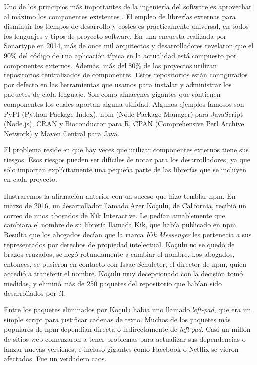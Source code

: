 

Uno de los principios más importantes de la ingeniería del software es aprovechar al máximo los componentes existentes \cite{sametinger1997software}.
El empleo de librerías externas para disminuir los tiempos de desarrollo y costes es prácticamente universal,
en todos los lenguajes y tipos de proyecto software. En una encuesta realizada por Sonartype en 2014, más de once mil arquitectos y
desarrolladores revelaron que el 90\% del código de una aplicación típica en la actualidad está compuesto por componentes externos.
Además, más del 80\% de los proyectos utilizan repositorios centralizados de componentes.
Estos repositorios están configurados por defecto en las herramientas que usamos para instalar y administrar los paquetes de cada lenguaje.
Son como almacenes gigantes que contienen componentes los cuales aportan alguna utilidad.
Algunos ejemplos famosos son PyPI (Python Package Index), npm (Node Package Manager) para JavaScript (Node.js),
CRAN y Bioconductor para R, CPAN (Comprehensive Perl Archive Network) y Maven Central para Java.


El problema reside en que hay veces que utilizar componentes externos tiene sus riesgos. Esos riesgos pueden ser difíciles de 
notar para los desarrolladores, ya que sólo importan explícitamente una pequeña parte de las librerías que se incluyen en cada proyecto.


Ilustraremos la afirmación anterior con un suceso que hizo temblar npm.
En marzo de 2016, un desarrollador llamado Azer Koçulu, de California, recibió un correo de unos abogados de Kik Interactive.
Le pedían amablemente que cambiara el nombre de su librería llamada Kik, que había publicado en npm.
Resulta que los abogados decían que la marca \textit{Kik Messenger} les pertenecía a sus representados \cite{BoldiPaolo2019} por derechos 
de propiedad intelectual.
Koçulu no se quedó de brazos cruzados, se negó rotundamente a cambiar el nombre.
Los abogados, entonces, se pusieron en contacto con Isaac Schuleter, el director de npm, quien accedió a transferir el nombre.
Koçulu muy decepcionado con la decisión tomó medidas, y eliminó más de 250 paquetes del repositorio que habían sido desarrollados por él.


Entre los paquetes eliminados por Koçulu había uno llamado \textit{left-pad}, que era un simple script para justificar cadenas de texto. Muchos de los paquetes más populares de npm dependían directa
o indirectamente de \textit{left-pad}. Casi un millón de sitios web comenzaron a tener problemas para actualizar sus dependencias o
lanzar nuevas versiones, e incluso gigantes como Facebook o Netflix se vieron afectados. Fue un verdadero caos.


